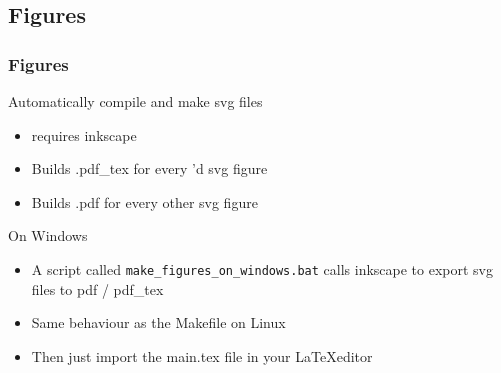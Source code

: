 \documentclass[c,12pt]{beamer}
\begin{document}
\subsection[fig]{Figures}
\begin{frame}[fragile]
	\frametitle{Figures}
	\begin{block}{Automatically compile and make svg files}
		\begin{itemize}
			\item requires inkscape
			\item Builds .pdf\_tex for every \verb||'d svg figure
			\item Builds .pdf for every other svg figure
		\end{itemize}
	\end{block}

	\begin{block}{On Windows}
		\begin{itemize}
			\item A script called \texttt{make\_figures\_on\_windows.bat} calls inkscape to export svg files to pdf / pdf\_tex
			\item Same behaviour as the Makefile on Linux
			\item Then just import the main.tex file in your \LaTeX editor
		\end{itemize}
	\end{block}
\end{frame}
\end{document}
